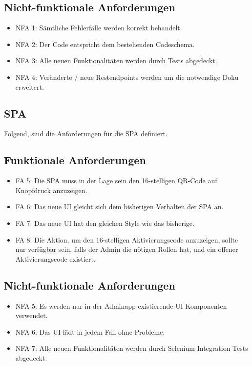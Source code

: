\subsection*{Nicht-funktionale Anforderungen}
\begin{itemize}
	\item NFA 1: Sämtliche Fehlerfälle werden korrekt behandelt.
	\item NFA 2: Der Code entspricht dem bestehenden Codeschema.
	\item NFA 3: Alle neuen Funktionalitäten werden durch Tests abgedeckt.
	\item NFA 4: Veränderte / neue Restendpoints werden um die notwendige Doku erweitert.
\end{itemize}

\subsection{SPA} \label{subsec:anforderungenSPA}

Folgend, sind die Anforderungen für die SPA definiert.

\subsection*{Funktionale Anforderungen}
\begin{itemize}
	\item FA 5: Die SPA muss in der Lage sein den 16-stelligen QR-Code auf Knopfdruck anzuzeigen.
	\item FA 6: Das neue UI gleicht sich dem bisherigen Verhalten der SPA an.
	\item FA 7: Das neue UI hat den gleichen Style wie das bisherige.
	\item FA 8: Die Aktion, um den 16-stelligen Aktivierungscode anzuzeigen, sollte nur verfügbar sein, falls der Admin die nötigen Rollen hat, und ein offener Aktivierungscode existiert.
\end{itemize}

\subsection*{Nicht-funktionale Anforderungen}
\begin{itemize}
	\item NFA 5: Es werden nur in der Adminapp existierende UI Komponenten verwendet.
	\item NFA 6: Das UI lädt in jedem Fall ohne Probleme.
	\item NFA 7: Alle neuen Funktionalitäten werden durch Selenium Integration Tests abgedeckt.
\end{itemize}

